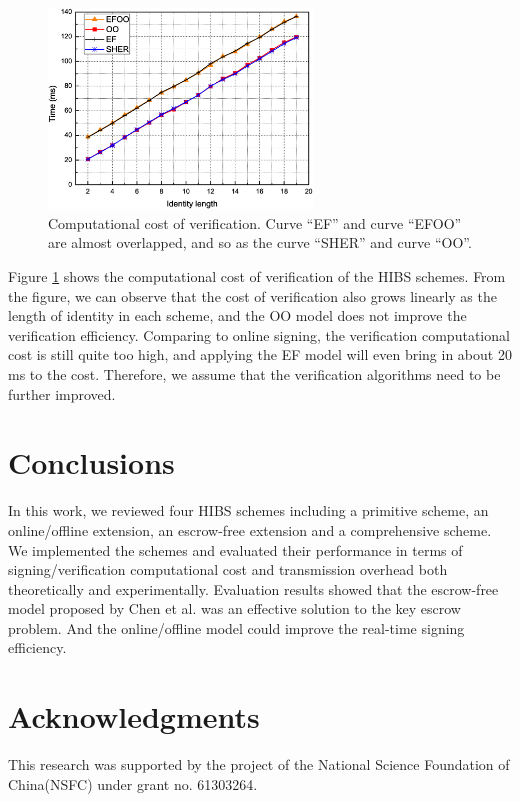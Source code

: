 \documentclass[letter]{ieice}
\begin{document}
\begin{figure}[htbp]
\centering
\includegraphics[width=7cm]{verify.eps}
\caption{Computational cost of verification. Curve ``EF'' and curve ``EFOO'' are almost overlapped, and so as the curve ``SHER'' and curve ``OO''.} \label{fig-verify}
\end{figure}

Figure \ref{fig-verify} shows the computational cost of verification of the HIBS schemes.
From the figure, we can observe that the cost of verification also grows linearly as the length of identity in each scheme, and the OO model does not improve the verification efficiency.
Comparing to online signing, the verification computational cost is still quite too high, and applying the EF model will even bring in about 20 ms to the cost. 
Therefore, we assume that the verification algorithms need to be further improved.

\section{Conclusions}
In this work, we reviewed four HIBS schemes including a primitive scheme, an online/offline extension, an escrow-free extension and a comprehensive scheme.
We implemented the schemes and evaluated their performance in terms of signing/verification computational cost and transmission overhead  both theoretically and experimentally.
Evaluation results showed that the escrow-free model proposed by Chen et al. was an effective solution to the key escrow problem. 
And the online/offline model could improve the real-time signing efficiency. 

\section*{Acknowledgments}
This research was supported by the project of the National Science Foundation of China(NSFC) under grant no. 61303264.

\end{document}
